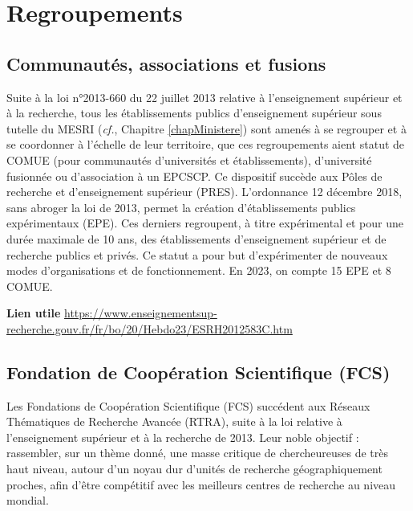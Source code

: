 \section{Regroupements}
\label{Regroupements}
\subsection{Communaut\'es, associations et fusions}
Suite \`a la loi n°2013-660 du 22 juillet 2013 relative \`a  l'enseignement sup\'erieur et \`a la recherche,
tous les \'etablissements publics d'enseignement sup\'erieur sous tutelle du MESRI ({\em cf.}, Chapitre \ref{chapMinistere}) sont amen\'es \`a  se regrouper et \`a se coordonner \`a l'\'echelle de leur territoire, que ces regroupements aient statut de COMUE (pour communaut\'es d'universit\'es et \'etablissements), d'universit\'e fusionn\'ee ou d'association \`a  un EPCSCP.
Ce dispositif succ\`ede aux P\^oles de recherche et d'enseignement sup\'erieur (PRES). L'ordonnance 12 d\'ecembre 2018, sans abroger la loi de 2013, permet la cr\'eation d'\'etablissements publics exp\'erimentaux (EPE). Ces derniers regroupent, \`a titre exp\'erimental et pour une dur\'ee maximale de 10 ans, des \'etablissements d'enseignement sup\'erieur et de recherche publics et priv\'es. Ce statut a pour but d'exp\'erimenter de nouveaux modes d'organisations et de fonctionnement. En 2023, on compte 15 EPE et 8 COMUE.

\textbf{Lien utile\hspace{.5em}}
\url{https://www.enseignementsup-recherche.gouv.fr/fr/bo/20/Hebdo23/ESRH2012583C.htm}

\subsection{Fondation de Coop\'eration Scientifique (FCS)}

Les Fondations de Coop\'eration Scientifique (FCS) succ\'edent aux R\'eseaux Th\'ematiques de Recherche Avanc\'ee (RTRA), suite \`a la loi relative \`a l'enseignement sup\'erieur et \`a la recherche de 2013.
Leur noble objectif : rassembler, sur un th\`eme donn\'e, une masse critique de chercheur\mp euse\mp s de tr\`es haut niveau, autour d'un noyau dur d'unit\'es de recherche g\'eographiquement proches, afin d'\^etre comp\'etitif avec les meilleurs centres de recherche au niveau mondial.

